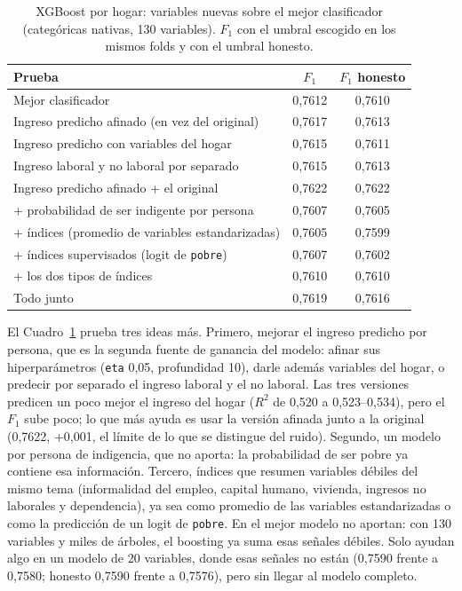 \documentclass[12pt]{article}
\begin{document}
\begin{table}[H]
  \centering
  \small
  \caption{XGBoost por hogar: variables nuevas sobre el mejor clasificador
    (categóricas nativas, 130 variables). $F_1$ con el umbral escogido en los
    mismos folds y con el umbral honesto.}
  \label{tab:mejoras}
  \begin{tabular}{@{}p{8.6cm}cc@{}}
    \toprule
    Prueba & $F_1$ & $F_1$ honesto \\
    \midrule
    Mejor clasificador & 0,7612 & 0,7610 \\
    Ingreso predicho afinado (en vez del original) & 0,7617 & 0,7613 \\
    Ingreso predicho con variables del hogar & 0,7615 & 0,7611 \\
    Ingreso laboral y no laboral por separado & 0,7615 & 0,7613 \\
    Ingreso predicho afinado + el original & 0,7622 & 0,7622 \\
    + probabilidad de ser indigente por persona & 0,7607 & 0,7605 \\
    + índices (promedio de variables estandarizadas) & 0,7605 & 0,7599 \\
    + índices supervisados (logit de \texttt{pobre}) & 0,7607 & 0,7602 \\
    + los dos tipos de índices & 0,7610 & 0,7610 \\
    Todo junto & 0,7619 & 0,7616 \\
    \bottomrule
  \end{tabular}
\end{table}

El Cuadro~\ref{tab:mejoras} prueba tres ideas más. Primero, mejorar el
ingreso predicho por persona, que es la segunda fuente de ganancia del
modelo: afinar sus hiperparámetros (\texttt{eta} 0,05, profundidad 10),
darle además variables del hogar, o predecir por separado el ingreso laboral
y el no laboral. Las tres versiones predicen un poco mejor el ingreso del
hogar ($R^2$ de 0,520 a 0,523--0,534), pero el $F_1$ sube poco; lo que más
ayuda es usar la versión afinada junto a la original (0,7622, +0,001, el
límite de lo que se distingue del ruido). Segundo, un modelo por persona de
indigencia, que no aporta: la probabilidad de ser pobre ya contiene esa
información. Tercero, índices que resumen variables débiles del mismo tema
(informalidad del empleo, capital humano, vivienda, ingresos no laborales y
dependencia), ya sea como promedio de las variables estandarizadas o como la
predicción de un logit de \texttt{pobre}. En el mejor modelo no aportan:
con 130 variables y miles de árboles, el boosting ya suma esas señales
débiles. Solo ayudan algo en un modelo de 20 variables, donde esas señales
no están (0,7590 frente a 0,7580; honesto 0,7590 frente a 0,7576), pero sin
llegar al modelo completo.
\end{document}
